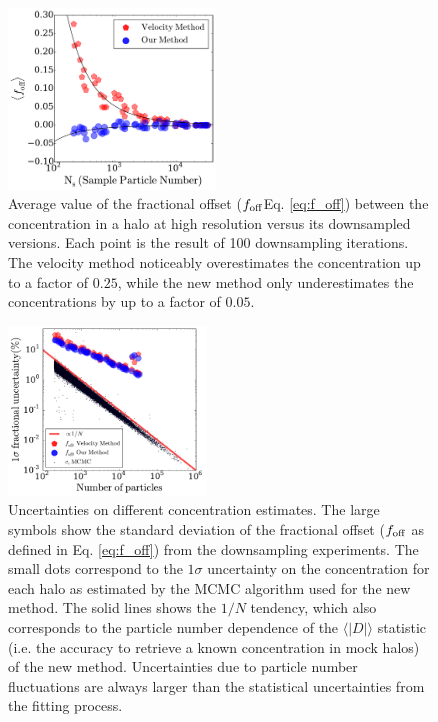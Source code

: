\documentclass{emulateapj}
\begin{document}
\begin{figure}
\begin{center}
  \includegraphics[width=0.49\textwidth]{avg_foff_bolshoi.pdf}
\end{center}
\vspace{-0.5cm}
\caption{Average value of the fractional offset ($f_{\rm
    off}$Eq. \ref{eq:f_off}) between the concentration in a halo at
  high resolution versus its downsampled versions.  Each point is the
  result of 100 downsampling iterations.  The velocity method
  noticeably overestimates the concentration up to a factor of $0.25$,
  while the new method only underestimates the concentrations by up to
  a factor of $0.05$.
    \label{fig:downsampling}}
\end{figure}

\begin{figure}
\begin{center}
  \includegraphics[width=0.47\textwidth]{error_conc_bolshoi.pdf}
\end{center}
\vspace{-0.5cm}
\caption{Uncertainties on different concentration estimates.  The
  large symbols show the standard deviation of the fractional offset
  ($f_{\rm off}$ as defined in Eq. \ref{eq:f_off}) from the downsampling
  experiments.  The small dots correspond to the $1\sigma$
  uncertainty on the concentration for each halo as estimated by the
  MCMC algorithm used for the new method.
  The solid lines shows the $1/N$ tendency, which also corresponds
  to the particle number dependence of the $\langle|D|\rangle$ statistic
  (i.e. the accuracy to retrieve a known concentration in mock halos)
  of the new method.
  Uncertainties due to particle number fluctuations are always larger
  than the statistical uncertainties from the fitting process. 
  \label{fig:downsampling_err}}
\end{figure}
\end{document}
